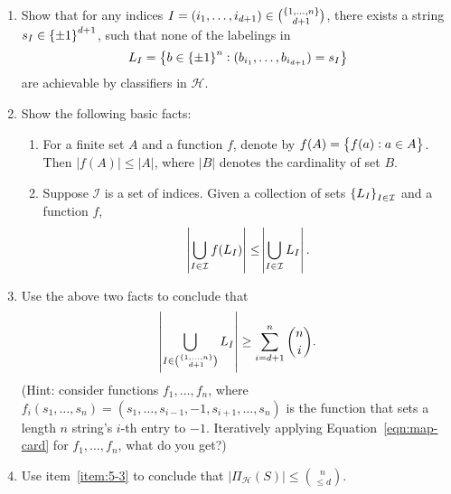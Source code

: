 \documentclass{article}
\newcommand{\Hcal}{\mathcal{H}} %
\newcommand{\Ical}{\mathcal{I}} %
\begin{document}
\begin{enumerate}
\item Show that for any indices $I = (i_1, \ldots, i_{d+1}) \in {\cbr{1,\ldots,n} \choose {d+1}}$, there exists a string $s_I \in \cbr{\pm 1}^{d+1}$, such that none of the labelings in
\[ L_I = \cbr{ b \in \cbr{\pm 1}^n: (b_{i_1}, \ldots, b_{i_{d+1}}) = s_I } \]
are achievable by classifiers in $\Hcal$.

\item Show the following basic facts:
\begin{enumerate}
\item For a finite set $A$ and a function $f$, denote by $f(A) = \cbr{f(a): a \in A}$. Then $|f(A)| \leq |A|$, where $|B|$ denotes the cardinality of set $B$.
\item Suppose $\Ical$ is a set of indices. Given a collection of sets $\cbr{L_I}_{I \in \Ical}$ and a function $f$,
\begin{equation}
  \abs{ \bigcup_{I \in \Ical} f(L_I)} \leq \abs{\bigcup_{I \in \Ical} L_I }.
  \label{eqn:map-card}
\end{equation}
\end{enumerate}

\item Use the above two facts to conclude that
\[ \abs{ \bigcup_{I \in {\cbr{1,\ldots,n} \choose {d+1}}} L_I } \geq \sum_{i=d+1}^n {n \choose i}. \]
(Hint: consider functions $f_1, \ldots, f_n$, where $f_i(s_1, \ldots, s_n) = (s_1, \ldots, s_{i-1}, -1, s_{i+1}, \ldots, s_n)$ is the function that sets a length $n$ string's $i$-th entry to $-1$. Iteratively applying Equation~\eqref{eqn:map-card} for $f_1,\ldots,f_n$, what do you get?)
\label{item:5-3}

\item Use item~\ref{item:5-3} to conclude that $|\Pi_\Hcal(S)| \leq {n \choose \leq d}$.
\end{enumerate}
\end{document}
